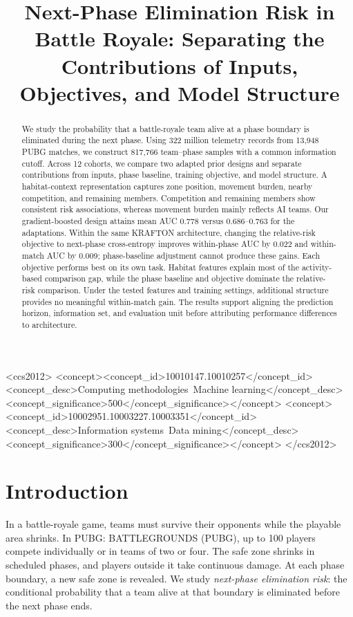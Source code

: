 \documentclass[sigconf,anonymous,nonacm]{acmart}
\begin{document}
\title[Next-Phase Elimination Risk in Battle Royale]{Next-Phase Elimination Risk in Battle Royale: Separating the Contributions of Inputs, Objectives, and Model Structure}
\begin{abstract}
We study the probability that a battle-royale team alive at a phase boundary is eliminated during the next phase. Using 322 million telemetry records from 13,948 PUBG matches, we construct 817,766 team--phase samples with a common information cutoff. Across 12 cohorts, we compare two adapted prior designs and separate contributions from inputs, phase baseline, training objective, and model structure. A habitat-context representation captures zone position, movement burden, nearby competition, and remaining members. Competition and remaining members show consistent risk associations, whereas movement burden mainly reflects AI teams. Our gradient-boosted design attains mean AUC 0.778 versus 0.686--0.763 for the adaptations. Within the same KRAFTON architecture, changing the relative-risk objective to next-phase cross-entropy improves within-phase AUC by 0.022 and within-match AUC by 0.009; phase-baseline adjustment cannot produce these gains. Each objective performs best on its own task. Habitat features explain most of the activity-based comparison gap, while the phase baseline and objective dominate the relative-risk comparison. Under the tested features and training settings, additional structure provides no meaningful within-match gain. The results support aligning the prediction horizon, information set, and evaluation unit before attributing performance differences to architecture.
\end{abstract}
\begin{CCSXML}
<ccs2012>
<concept><concept_id>10010147.10010257</concept_id><concept_desc>Computing methodologies~Machine learning</concept_desc><concept_significance>500</concept_significance></concept>
<concept><concept_id>10002951.10003227.10003351</concept_id><concept_desc>Information systems~Data mining</concept_desc><concept_significance>300</concept_significance></concept>
</ccs2012>
\end{CCSXML}
\maketitle
\section{Introduction}
\label{sec:introduction}
In a battle-royale game, teams must survive their opponents while the playable area shrinks. In PUBG: BATTLEGROUNDS (PUBG), up to 100 players compete individually or in teams of two or four. The safe zone shrinks in scheduled phases, and players outside it take continuous damage. At each phase boundary, a new safe zone is revealed. We study \emph{next-phase elimination risk}: the conditional probability that a team alive at that boundary is eliminated before the next phase ends.
\end{document}
